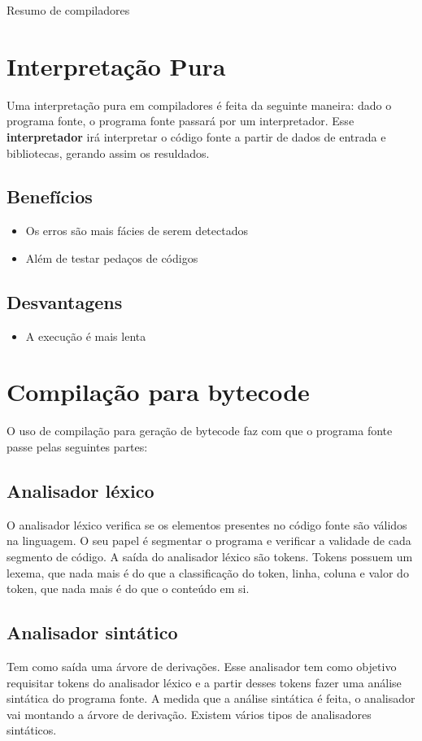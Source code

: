 \documentclass[11pt]{article}
\author{Lucas Peixoto}
\date{\today}
\title{}
\begin{document}
\tableofcontents

Resumo de compiladores

\section{Interpretação Pura}
\label{sec:orgc448c15}
Uma interpretação pura em compiladores é feita da seguinte maneira:
dado o programa fonte, o programa fonte passará por um
interpretador. Esse \textbf{interpretador} irá interpretar o código fonte a
partir de dados de entrada e bibliotecas, gerando assim os
resuldados.

\subsection{Benefícios}
\label{sec:org6c057c9}
\begin{itemize}
\item Os erros são mais fácies de serem detectados
\item Além de testar pedaços de códigos
\end{itemize}

\subsection{Desvantagens}
\label{sec:org023f03b}
\begin{itemize}
\item A execução é mais lenta
\end{itemize}

\section{Compilação para bytecode}
\label{sec:org954d377}
O uso de compilação para geração de bytecode faz com que o programa
fonte passe pelas seguintes partes:

\subsection{Analisador léxico}
\label{sec:org650e104}
O analisador léxico verifica se os elementos presentes no código
fonte são válidos na linguagem. O seu papel é segmentar o programa
e verificar a validade de cada segmento de código. A saída do
analisador léxico são tokens. Tokens possuem um lexema, que nada
mais é do que a classificação do token, linha, coluna e valor do
token, que nada mais é do que o conteúdo em si.

\subsection{Analisador sintático}
\label{sec:org963d3a3}
Tem como saída uma árvore de derivações. Esse analisador tem como
objetivo requisitar tokens do analisador léxico e a partir desses
tokens fazer uma análise sintática do programa fonte. A medida que
a análise sintática é feita, o analisador vai montando a árvore de
derivação. Existem vários tipos de analisadores sintáticos.
\end{document}
